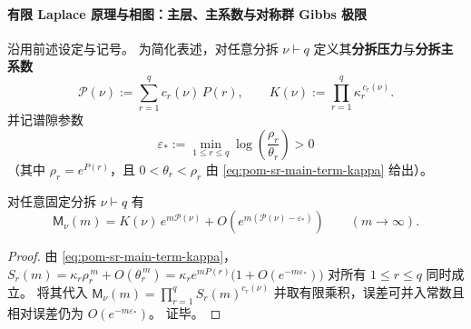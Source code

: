 
\paragraph{有限 Laplace 原理与相图：主层、主系数与对称群 Gibbs 极限}
沿用前述设定与记号。
为简化表述，对任意分拆 \(\nu\vdash q\) 定义其\textbf{分拆压力}与\textbf{分拆主系数}
\[
\mathcal{P}(\nu):=\sum_{r=1}^{q} c_r(\nu)\,P(r),
\qquad
K(\nu):=\prod_{r=1}^{q}\kappa_r^{\,c_r(\nu)}.
\]
并记谱隙参数
\[
\varepsilon_*:=\min_{1\le r\le q}\log\!\left(\frac{\rho_r}{\theta_r}\right)>0
\]
（其中 \(\rho_r=e^{P(r)}\)，且 \(0<\theta_r<\rho_r\) 由 \eqref{eq:pom-sr-main-term-kappa} 给出）。

\begin{lemma}[分拆单项式的指数主项]\label{lem:pom-partition-monomial-exponential-main-term}
对任意固定分拆 \(\nu\vdash q\) 有
\[
\mathsf{M}_\nu(m)=K(\nu)\,e^{m\mathcal{P}(\nu)}+O\!\left(e^{m(\mathcal{P}(\nu)-\varepsilon_*)}\right)\qquad(m\to\infty).
\]
\end{lemma}
\begin{proof}
由 \eqref{eq:pom-sr-main-term-kappa}，
\(
S_r(m)=\kappa_r\rho_r^{\,m}+O(\theta_r^{\,m})
=\kappa_r e^{mP(r)}\bigl(1+O(e^{-m\varepsilon_*})\bigr)
\)
对所有 \(1\le r\le q\) 同时成立。
将其代入 \(\mathsf{M}_\nu(m)=\prod_{r=1}^{q}S_r(m)^{c_r(\nu)}\) 并取有限乘积，误差可并入常数且相对误差仍为 \(O(e^{-m\varepsilon_*})\)。
证毕。
\end{proof}

